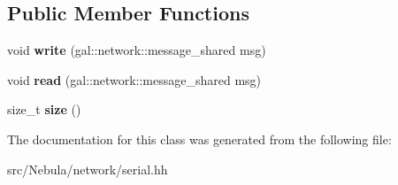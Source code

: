 \subsection*{Public Member Functions}
\begin{DoxyCompactItemize}
\item 
\hypertarget{classgal_1_1network_1_1serial2_afb7c93f57726c3dd3ec0332134bcd9b2}{void {\bfseries write} (gal\-::network\-::message\-\_\-shared msg)}\label{classgal_1_1network_1_1serial2_afb7c93f57726c3dd3ec0332134bcd9b2}

\item 
\hypertarget{classgal_1_1network_1_1serial2_ad1dd2750aa53ca2294b34a7f04a5cef7}{void {\bfseries read} (gal\-::network\-::message\-\_\-shared msg)}\label{classgal_1_1network_1_1serial2_ad1dd2750aa53ca2294b34a7f04a5cef7}

\item 
\hypertarget{classgal_1_1network_1_1serial2_adb6e73cdcbc1f67f71eaed2bdbeab6bb}{size\-\_\-t {\bfseries size} ()}\label{classgal_1_1network_1_1serial2_adb6e73cdcbc1f67f71eaed2bdbeab6bb}

\end{DoxyCompactItemize}


The documentation for this class was generated from the following file\-:\begin{DoxyCompactItemize}
\item 
src/\-Nebula/network/serial.\-hh\end{DoxyCompactItemize}
